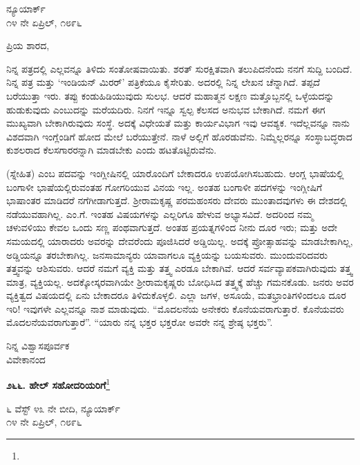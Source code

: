 \begin{flushright}
ನ್ಯೂಯಾರ್ಕ್\\೧೪ ನೇ ಏಪ್ರಿಲ್, ೧೮೯೬
\end{flushright}
\vspace{-0.5cm}

\noindent
ಪ್ರಿಯ ಶಾರದ,

ನಿನ್ನ ಪತ್ರದಲ್ಲಿ ಎಲ್ಲವನ್ನೂ ತಿಳಿದು ಸಂತೋಷವಾಯಿತು. ಶರತ್ ಸುರಕ್ಷಿತವಾಗಿ ತಲುಪಿದನೆಂದು ನನಗೆ ಸುದ್ದಿ ಬಂದಿದೆ. ನಿನ್ನ ಪತ್ರ ಮತ್ತು ‘ಇಂಡಿಯನ್ ಮಿರರ್’ ಪತ್ರಿಕೆಯೂ ಕೈಸೇರಿತು. ಅದರಲ್ಲಿ ನಿನ್ನ ಲೇಖನ ಚೆನ್ನಾಗಿದೆ. ತಪ್ಪದೆ ಬರೆಯುತ್ತಾ ಇರು. ತಪ್ಪು ಕಂಡುಹಿಡಿಯುವುದು ಸುಲಭ. ಆದರೆ ಮಹಾತ್ಮನ ಲಕ್ಷಣ ಮತ್ತೊಬ್ಬನಲ್ಲಿ ಒಳ್ಳೆಯದನ್ನು ಹುಡುಕುವುದು ಎಂಬುದನ್ನು ಮರೆಯದಿರು. ನಿನಗೆ ಇನ್ನೂ ಸ್ವಲ್ಪ ಕೆಲಸದ ಅನುಭವ ಬೇಕಾಗಿದೆ. ನಮಗೆ ಈಗ ಮುಖ್ಯವಾಗಿ ಬೇಕಾಗಿರುವುದು ಸಂಸ್ಥೆ. ಅದಕ್ಕೆ ವಿಧೇಯತೆ ಮತ್ತು ಕಾರ್ಯವಿಭಾಗ ಇವು ಆವಶ್ಯಕ. ಇದೆಲ್ಲವನ್ನೂ ನಾನು ವಿಶದವಾಗಿ ಇಂಗ್ಲೆಂಡಿಗೆ ಹೋದ ಮೇಲೆ ಬರೆಯುತ್ತೇನೆ. ನಾಳೆ ಅಲ್ಲಿಗೆ ಹೊರಡುವೆನು. ನಿಮ್ಮೆಲ್ಲರನ್ನೂ ಸಂಸ್ಥಾಬದ್ಧರಾದ ಕುಶಲರಾದ ಕೆಲಸಗಾರರನ್ನಾಗಿ ಮಾಡಬೇಕು ಎಂದು ಹಟತೊಟ್ಟಿರುವೆನು.

 (ಸ್ನೇಹಿತ) ಎಂಬ ಪದವನ್ನು ಇಂಗ್ಲೀಷಿನಲ್ಲಿ ಯಾರೊಂದಿಗೆ ಬೇಕಾದರೂ ಉಪಯೋಗಿಸಬಹುದು. ಆಂಗ್ಲ ಭಾಷೆಯಲ್ಲಿ ಬಂಗಾಳೀ ಭಾಷೆಯಲ್ಲಿರುವಂತಹ ಗೋಗರಿಯುವ ವಿನಯ ಇಲ್ಲ. ಅಂತಹ ಬಂಗಾಳೀ ಪದಗಳನ್ನು ಇಂಗ್ಲೀಷಿಗೆ ಭಾಷಾಂತರ ಮಾಡಿದರೆ ನಗೆಗೀಡಾಗುತ್ತದೆ. ಶ‍್ರೀರಾಮಕೃಷ್ಣ ಪರಮಹಂಸರು ದೇವರು ಮುಂತಾದವುಗಳು ಈ ದೇಶದಲ್ಲಿ ನಡೆಯುವಹಾಗಿಲ್ಲ. ಎಂ.ಗೆ. ಇಂತಹ ವಿಷಯಗಳನ್ನು ಎಲ್ಲರಿಗೂ ಹೇಳುವ ಅಭ್ಯಾಸವಿದೆ. ಅದರಿಂದ ನಮ್ಮ ಚಳುವಳಿಯು ಕೇವಲ ಒಂದು ಸಣ್ಣ ಪಂಥವಾಗುತ್ತದೆ. ಅಂತಹ ಪ್ರಯತ್ನಗಳಿಂದ ನೀನು ದೂರ ಇರು; ಮತ್ತು ಅದೇ ಸಮಯದಲ್ಲಿ ಯಾರಾದರು ಅವರನ್ನು ದೇವರೆಂದು ಪೂಜಿಸಿದರೆ ಅಡ್ಡಿಯಿಲ್ಲ. ಅದಕ್ಕೆ ಪ್ರೋತ್ಸಾಹವನ್ನು ಮಾಡಬೇಕಾಗಿಲ್ಲ, ಅಡ್ಡಿಯನ್ನೂ ತರಬೇಕಾಗಿಲ್ಲ. ಜನಸಾಮಾನ್ಯರು ಯಾವಾಗಲೂ ವ್ಯಕ್ತಿಯನ್ನು ಬಯಸುವರು. ಮುಂದುವರಿದವರು ತತ್ತ್ವವನ್ನು ಆಶಿಸುವರು. ಆದರೆ ನಮಗೆ ವ್ಯಕ್ತಿ ಮತ್ತು ತತ್ತ್ವ ಎರಡೂ ಬೇಕಾಗಿವೆ. ಆದರೆ ಸರ್ವವ್ಯಾಪಕವಾಗಿರುವುದು ತತ್ತ್ವ ಮಾತ್ರ, ವ್ಯಕ್ತಿಯಲ್ಲ. ಅದಕ್ಕೋಸ್ಕರವಾಗಿಯೇ ಶ‍್ರೀರಾಮಕೃಷ್ಣರು ಬೋಧಿಸಿದ ತತ್ತ್ವಕ್ಕೆ ಹೆಚ್ಚು ಗಮನಕೊಡು. ಜನರು ಅವರ ವ್ಯಕ್ತಿತ್ವದ ವಿಷಯದಲ್ಲಿ ಏನು ಬೇಕಾದರೂ ತಿಳಿದುಕೊಳ್ಳಲಿ. ಎಲ್ಲಾ ಜಗಳ, ಅಸೂಯೆ, ಮತಭ್ರಾಂತಿಗಳಿಂದಲೂ ದೂರ ಇರಿ! ಇವುಗಳೇ ಎಲ್ಲವನ್ನೂ ನಾಶ ಮಾಡುವುದು. “ಮೊದಲನೆಯ ಅನೇಕರು ಕೊನೆಯವರಾಗುತ್ತಾರೆ. ಕೊನೆಯವರು ಮೊದಲನೆಯವರಾಗುತ್ತಾರೆ”. “ಯಾರು ನನ್ನ ಭಕ್ತರ ಭಕ್ತರೋ ಅವರೇ ನನ್ನ ಶ್ರೇಷ್ಠ ಭಕ್ತರು”.

{\flushright
ನಿನ್ನ ವಿಶ್ವಾಸಪೂರ್ವಕ\\ವಿವೇಕಾನಂದ\par}

\begin{center}
\textbf{೨೬೬. ಹೇಲ್ ಸಹೋದರಿಯರಿಗೆ}\footnote{}
\end{center}

\begin{flushright}
೬ ವೆಸ್ಟ್ ೪೩ ನೇ ಬೀದಿ, ನ್ಯೂಯಾರ್ಕ್\\೧೪ ನೇ ಏಪ್ರಿಲ್, ೧೮೯೬
\end{flushright}

